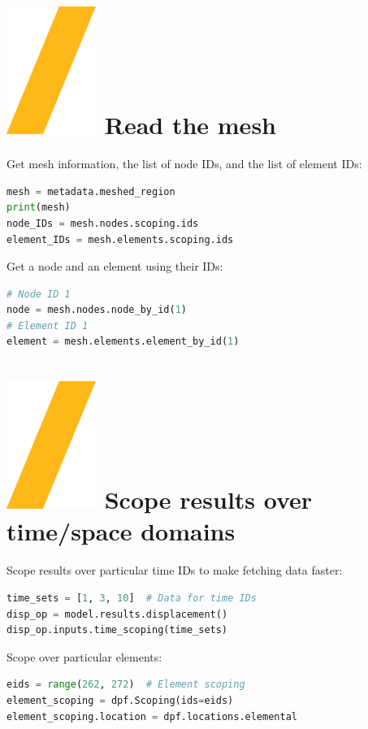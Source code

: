 \documentclass[9pt,landscape]{article}
\begin{document}
\begin{multicols}{3}
\vfill
\columnbreak

\section{\includegraphics[height=\fontcharht\font`\S]{slash.png} Read the mesh}
Get mesh information, the list of node IDs, and the list of element IDs:
\begin{lstlisting}[language=Python]
mesh = metadata.meshed_region
print(mesh)
node_IDs = mesh.nodes.scoping.ids
element_IDs = mesh.elements.scoping.ids
\end{lstlisting}

Get a node and an element using their IDs:
\begin{lstlisting}[language=Python]
# Node ID 1
node = mesh.nodes.node_by_id(1)
# Element ID 1
element = mesh.elements.element_by_id(1)
\end{lstlisting}


\section{\includegraphics[height=\fontcharht\font`\S]{slash.png} Scope results over time/space domains}
Scope results over particular time IDs to make fetching data faster:
\begin{lstlisting}[language=Python]
time_sets = [1, 3, 10]  # Data for time IDs
disp_op = model.results.displacement()
disp_op.inputs.time_scoping(time_sets)
\end{lstlisting}

Scope over particular elements:
\begin{lstlisting}[language=Python]
eids = range(262, 272)  # Element scoping
element_scoping = dpf.Scoping(ids=eids)
element_scoping.location = dpf.locations.elemental


\end{lstlisting}
\end{multicols}
\end{document}
